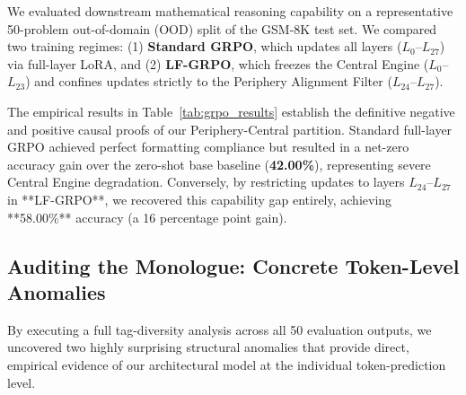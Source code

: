 \documentclass[11pt]{article}
\begin{document}
We evaluated downstream mathematical reasoning capability on a representative 50-problem out-of-domain (OOD) split of the GSM-8K test set. We compared two training regimes: (1) \textbf{Standard GRPO}, which updates all layers ($L_0$--$L_{27}$) via full-layer LoRA, and (2) \textbf{LF-GRPO}, which freezes the Central Engine ($L_0$--$L_{23}$) and confines updates strictly to the Periphery Alignment Filter ($L_{24}$--$L_{27}$).

\begin{table}[h]
\centering
\caption{Downstream GSM-8K Mathematical Reasoning Accuracy}
\label{tab:grpo_results}
\end{table}

The empirical results in Table~\ref{tab:grpo_results} establish the definitive negative and positive causal proofs of our Periphery-Central partition. Standard full-layer GRPO achieved perfect formatting compliance but resulted in a net-zero accuracy gain over the zero-shot base baseline (\textbf{42.00\%}), representing severe Central Engine degradation. Conversely, by restricting updates to layers $L_{24}$--$L_{27}$ in **LF-GRPO**, we recovered this capability gap entirely, achieving **58.00\%** accuracy (a 16 percentage point gain).

\subsection{Auditing the Monologue: Concrete Token-Level Anomalies}

By executing a full tag-diversity analysis across all 50 evaluation outputs, we uncovered two highly surprising structural anomalies that provide direct, empirical evidence of our architectural model at the individual token-prediction level.
\end{document}
